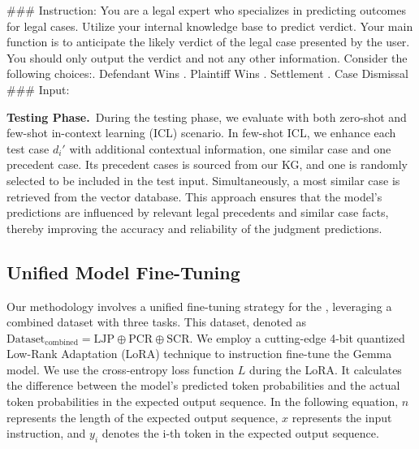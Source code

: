 \begin{formal}
\#\#\# Instruction:\newline
You are a legal expert who specializes in predicting outcomes for legal cases. Utilize your internal knowledge base to predict verdict. Your main function is to anticipate the likely verdict of the legal case presented by the user.
\newline
You should only output the verdict and not any other information. \newline
Consider the following choices:. Defendant Wins . Plaintiff Wins . Settlement . Case Dismissal\newline
\#\#\# Input:
\end{formal}

\vspace{3pt}\noindent\textbf{Testing Phase.}\, During the testing phase, we evaluate \sysname with both zero-shot and few-shot in-context learning (ICL) scenario. In few-shot ICL, we enhance each test case \(d_i'\) with additional contextual information, one similar case and one precedent case. Its precedent cases is sourced from our KG, and one is randomly selected to be included in the test input. Simultaneously, a most similar case is retrieved from the vector database. This approach ensures that the model's predictions are influenced by relevant legal precedents and similar case facts, thereby improving the accuracy and reliability of the judgment predictions.

\subsection{Unified Model Fine-Tuning}

Our methodology involves a unified fine-tuning strategy for the \sysname, leveraging a combined dataset with three tasks. This dataset, denoted as \(\text{Dataset}_{\text{combined}} = \text{LJP} \oplus \text{PCR} \oplus \text{SCR} \). We employ a cutting-edge 4-bit quantized Low-Rank Adaptation (LoRA) technique to instruction fine-tune the Gemma model. We use the cross-entropy loss function $L$ during the LoRA. It calculates the difference between the model's predicted token probabilities and the actual token probabilities in the expected output sequence. In the following equation, $n$ represents the length of the expected output sequence, $x$ represents the input instruction, and $y_i$ denotes the i-th token in the expected output sequence.

